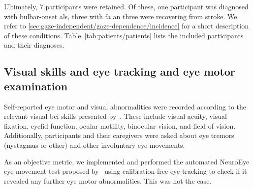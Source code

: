 Ultimately, 7 participants were retained.
Of these, one participant was diagnosed with bulbar-onset \ac{als}, three with
\ac{fa} an three were recovering from stroke.
We refer to \cref{sec:gaze-independent/gaze-dependence/incidence} for a short
description of these conditions.
Table~\ref{tab:patients/patients} lists the included participants and their
diagnoses.

\newcommand{\fnkuebler}{%
  \footnote{
``With minor degree of impairment,
we refer to patients who had only slightly impaired limb movement
and normal speech. Under the category moderate impairment, we
summarized those patients with restricted limb movement (wheelchair-bound) and
unaffected speech or intact limb movement without speech (such as the bulbar form of ALS which first affects speech
and swallowing). Patients who were almost tetraplegic with restricted speech were considered majorly impaired. Categories four
and five were the LIS and the CLIS, respectively."~\cite{Kuebler2008}
  }
}
\begin{table}[t]
  \centering
  \makebox[\textwidth][c]{%
  \footnotesize
  
  }
  \caption[Included participants with their diagnosis and
  capabilities.]{Included participants with their diagnosis and
  capabilities.
  Trach.: underwent a tracheostomy, Cls. W: classification according
  to~\textcite{Wolpaw2006}, Cls. KB: classification according
  to~\textcite{Kuebler2008}\fnkuebler.
  }
  \label{tab:patients/patients}
\end{table}


\subsection{Visual skills and eye tracking and eye motor examination}

Self-reported eye motor and visual abnormalities were recorded according to the
relevant visual \ac{bci} skills presented by~\textcite{FriedOken2020}.
These include visual acuity, visual fixation, eyelid function, ocular motility,
binocular vision, and field of vision.
Additionally, participants and their caregivers were asked about eye tremors
(nystagmus or other) and other involuntary eye movements.

As an objective metric, we implemented and performed the automated NeuroEye eye movement
test proposed by~\textcite{Hassan2022} using calibration-free eye tracking to
check if it revealed any further eye motor abnormalities.
This was not the case.

